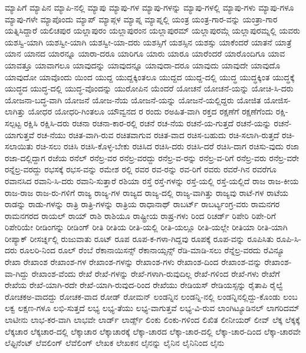 {ಮ್ಯಾಪಿಗೆ
ಮ್ಯಾಪಿನ
ಮ್ಯಾಪಿ-ನಲ್ಲಿ
ಮ್ಯಾಪು
ಮ್ಯಾಪು-ಗಳ
ಮ್ಯಾಪು-ಗಳನ್ನು
ಮ್ಯಾಪು-ಗಳಲ್ಲಿ
ಮ್ಯಾಪು-ಗಳು
ಮ್ಯಾಪು-ಗಳೂ
ಮ್ಯಾಪು-ಗಳೇ
ಮ್ಯಾಪೊಂದು
ಮ್ಯಾಪ್
ಮ್ಯಾಪ್ಗಳ
ಮ್ಯಾಪ್ನ
ಮ್ಯಾಪ್ನಲ್ಲಿ
ಯಂತ್ರ
ಯಂತ್ರ-ಗಾರ-ವನ್ನು
ಯಂತ್ರಾ-ಗಾರ
ಯತ್ನಿಸಿದ್ದಾರೆ
ಯಲಿಚಪುರ
ಯಲ್ಲಾಪುರಂ
ಯಲ್ಲಾಪುರಂನ
ಯಲ್ಲಾಪುರಮ್
ಯಲ್ಲಾಪುರಮ್ಗೆ
ಯಲ್ಲಾಪುರಮ್ನಲ್ಲಿ
ಯವರು
ಯಶಸ್ವಿ-ಯಾಗಿ
ಯಶಸ್ವೀ-ಯಾಗಿ
ಯಶಸ್ವೀ-ಯಾ-ದರು
ಯಶಸ್ಸಿಗೆ
ಯಶಸ್ಸಿನ
ಯಶಸ್ಸು
ಯಾಕೆಂದರೆ
ಯಾತನೆ
ಯಾತ್ರೆ
ಯಾನ
ಯಾನದ
ಯಾರನ್ನೂ
ಯಾರಾ-ದರೂ
ಯಾರಿಗೂ
ಯಾರು
ಯಾರೂ
ಯಾರೆಂದರೆ
ಯಾರೊಂದಿಗೂ
ಯಾವ
ಯಾವತ್ತೂ
ಯಾವಾಗಲೂ
ಯಾವುದನ್ನು
ಯಾವುದನ್ನೂ
ಯಾವುದಾ-ದರೂ
ಯಾವುದು
ಯಾವುದೇ
ಯಾವುದೊ
ಯಾವುದೋ
ಯಾವೊಂದು
ಯಿಂದ
ಯುದ್ದ
ಯುದ್ದಕ್ಕಿಂತಲೂ
ಯುದ್ದದ
ಯುದ್ದ-ದಲ್ಲಿ
ಯುದ್ಧ
ಯುದ್ಧಕ್ಕಿಂತ
ಯುದ್ಧಕ್ಕೆ
ಯುದ್ಧದ
ಯುದ್ಧ-ದಲ್ಲಿ
ಯುದ್ಧ-ವೊಂದನ್ನು
ಯುರೋಪಿನ
ಯೆಂದರೆ
ಯೋಚನೆ
ಯೋಚನೆ-ಯನ್ನು
ಯೋಚಿ-ಸಿ-ದರು
ಯೋಜನಾ-ಬದ್ಧ-ವಾಗಿ
ಯೋಜನೆ
ಯೋಜ-ನೆಯ
ಯೋಜನೆ-ಯನ್ನು
ಯೋಜನೆ-ಯಲ್ಲಿದ್ದರು
ಯೋಜಿತ
ಯೋಜಿಸ-ಲಾಗಿತ್ತು
ಯೋಧರ
ಯೋಧರಿ-ಗಿಂತಲೂ
ಯೌವ್ವನದ
ರ
ರಂದು
ರಅಹಿತ-ವಾಗಿ
ರಕ್ತದ
ರಕ್ಷಣೆಗೆ
ರಕ್ಷಣೆಗೆಂದು
ರಕ್ಷಿ-ಸಲ್ಪಟ್ಟ
ರಕ್ಷಿಸಿ
ರಕ್ಷಿಸಿ-ದರು
ರಚನಾ
ರಚನಾ-ಕಾರ-ರಲ್ಲಿ
ರಚನೆ
ರಚ-ನೆಯ
ರಚನೆ-ಯ-ಗುತ್ತದೆ
ರಚನೆ-ಯನ್ನು
ರಚನೆ-ಯಾಗುತ್ತವೆ
ರಚ-ನೆಯು
ರಚಿತ-ವಾಗಿ-ರುವ
ರಚಿತವಾಗುವ
ರಚಿತ-ವಾದ
ರಚಿಸ-ಬಹುದು
ರಚಿ-ಸಲಾಗಿ-ರುತ್ತದೆ
ರಚಿ-ಸಲಾಯಿತು
ರಚಿ-ಸಲು
ರಚಿಸಿ
ರಚಿಸಿ-ಕೊಳ್ಳ-ಬೇಕು
ರಚಿಸಿದ
ರಚಿಸಿ-ದರು
ರಚಿಸಿ-ದರೆ
ರಚಿಸಿ-ದಾಗ
ರಚಿಸು-ವುದು
ರಜಾ
ರಜಾ-ದಲ್ಲಿದ್ದಾಗ
ರಜೆಯ
ರನೆಲ್
ರನೆಲ್ರ-ವರ
ರನೆಲ್ರ-ವರದ್ದು
ರನೆಲ್ರ-ವ-ರನ್ನು
ರನೆಲ್ರ-ವ-ರಿಗೆ
ರನೆಲ್ರ-ವರು
ರನೆಲ್ರ-ವರೇ
ರನ್ನೆಲ್ರ-ವರದ್ದು
ರಭಸಕ್ಕೆ
ರಭಸ-ವನ್ನು
ರಮೇಶ
ರಲ್ಲಿ
ರವರ
ರವ-ರನ್ನು
ರವ-ರಿಗೆ
ರವರು
ರವರೆ-ಗಿನ
ರವರೆಗೂ
ರವಾನಸಿದ
ರವಾನಿ-ಸಿ-ದರು
ರವಾನಿ-ಸುತ್ತಾರೆ
ರಶಿಯಾ
ರಸ್ತೆ
ರಸ್ತೆ-ಗಳನ್ನು
ರಸ್ತೆ-ಯಲ್ಲಿ
ರಸ್ತೆ-ಯಲ್ಲಿದೆ
ರಾಜ
ರಾಜ-ಕೀಯ
ರಾಜ-ರಾಜ
ರಾಜ-ರು-ಗಳಿಗೆ
ರಾಜ್ಯ
ರಾಜ್ಯ-ಗಳ
ರಾಜ್ಯದ
ರಾಜ್ಯ-ದಲ್ಲಿ
ರಾಜ್ಯ-ವಾಗಿತ್ತು
ರಾಜ್ಯವು
ರಾಟೆ-ಗಳ
ರಾಟೆಯ
ರಾಡನ್ನು
ರಾಡು-ಗಳನ್ನು
ರಾತ್ರಿ
ರಾತ್ರಿ-ಗಳನ್ನು
ರಾತ್ರಿಯ
ರಾಧಾನಾಥ್
ರಾಬರ್ಟ್
ರಾಬರ್ಟ್ಯಂಗ್ರ-ವರು
ರಾಮನಗರ
ರಾಮನಗರದ
ರಾಯಲ್
ರಾಯ್
ರಾಶಿ
ರಾಶಿಯೂ
ರಾಷ್ಟ್ರೀಯ
ರಾಷ್ರ-ಗಳು
ರಿಂದ
ರಿಚರ್ಡ್
ರಿಪೇರಿ
ರಿಪೇ-ರಿಗೆ
ರಿಪೇರಿಯೇ
ರೀಡಿಂಗನ್ನು
ರೀಡಿಂಗ್
ರೀತಿ
ರೀತಿಯ
ರೀತಿ-ಯಲ್ಲಿ
ರೀತಿ-ಯಲ್ಲೂ
ರೀತಿ-ಯಲ್ಲೇ
ರೀತಿಯಾ
ರೀತಿ-ಯಾಗಿ
ರೀಪ್ಯಾಕ್
ರೀಸರ್ಚ್ನಲ್ಲಿ
ರುಜುವಾತು
ರೂಟ್
ರೂಪ
ರೂಪ-ಕ-ಗಳಾ-ಗಿದ್ದವು
ರೂಪಕ್ಕೆ
ರೂಪ-ವನ್ನು
ರೂಪಿಸಿತು
ರೂಪಿ-ಸಿ-ದರು
ರೂಲರಿ-ನಿಂದ
ರೂಲ್
ರೆಂಬೆ
ರೆಕಾನಾಯಿಸನ್ಸ್
ರೆಕಾನಾಯ್ಸನ್ಸ್
ರೆಡಿ-ಮಾಡಿ-ಸಲು
ರೆನ್ನೆಲ್ರ-ವರದು
ರೆವಿನ್ಯೂ
ರೇಖಾ
ರೇಖಾಂಶ
ರೇಖಾಂಶ-ಗಳ
ರೇಖಾಂಶ-ಗಳನ್ನು
ರೇಖಾಂಶ-ಗಳು
ರೇಖಾಂಶ-ದಿಂದ
ರೇಖಾಂಶ-ವನ್ನು
ರೇಖಾಂಶ-ವಾ-ಗಿದ್ದು
ರೇಖಾಂಶ-ವೆಂದು
ರೇಖೆ
ರೇಖೆ-ಗಳನ್ನು
ರೇಖೆ-ಗಳಾಗಿ-ರುವುದಿಲ್ಲ
ರೇಖೆ-ಗಳಿಂದ
ರೇಖೆ-ಗಳು
ರೇಖೆಗೆ
ರೇಖೆಯ
ರೇಖೆ-ಯಾಗಿ-ರದೇ
ರೇಖೆ-ಯಾಗಿ-ರುವುದ-ರಿಂದ
ರೇಖೆಯು
ರೇಡಿಯಸ್
ರೇಡಿಯಸ್ಸನ್ನು
ರೈತಾಪಿ
ರೈಲ್ವೆ
ರೋಚಕಅ-ವಾದದ್ದು
ರೋಚಕ-ವಾದ
ರೋಡ್
ರೋಮನ್
ಲಂಡನ್ನಿನ
ಲಂಡನ್ನಿ-ನಲ್ಲಿ
ಲಂಡನ್ನಿನಲ್ಲಿದ್ದು-ಕೊಂಡು
ಲಂಬ
ಲಕ್ವ
ಲಕ್ಷಣ-ಗಳೂ
ಲಭಿ-ಸುತ್ತದೆ
ಲಭ್ಯ
ಲಭ್ಯ-ತೆಯು
ಲಭ್ಯ-ವಾಗುತ್ತವೆ
ಲಭ್ಯ-ವಿ-ರುವ
ಲಾಂಗಿಟ್ಯೂಡಿನಲ್
ಲಾಗರಿದಮ್
ಲಾಟೀನು
ಲಾಭ-ಕರ-ವಾಗಿ
ಲಾಭವೇ
ಲಾರ್ಡ್
ಲಾರ್ಡ್ಸ್
ಲಿಂಕು
ಲಿಂಕು-ಗಳಿಂದ
ಲಿಖಿತ
ಲೀನೀಯರ್
ಲೀವ್
ಲೆಕ್ಕ
ಲೆಕ್ಕಕ್ಕೆ
ಲೆಕ್ಕಚಾರ
ಲೆಕ್ಕಚಾರ-ದಲ್ಲಿ
ಲೆಕ್ಕಾಚಾರ
ಲೆಕ್ಕಾಚಾರಕ್ಕೆ
ಲೆಕ್ಕಾ-ಚಾರದ
ಲೆಕ್ಕಾ-ಚಾರ-ದಲ್ಲಿ
ಲೆಕ್ಕಾ-ಚಾರ-ದಿಂದ
ಲೆಕ್ಕಾ-ಚಾರವೇ
ಲೆಫ್ಟಿನೆಂಟ್
ಲೆವಲಿಂಗ್
ಲೆವೆಲಿಂಗ್
ಲೇಖಕ
ಲೇಖಕನ
ಲೈನನ್ನು
ಲೈನಿನ
ಲೈನಿನಿಂದ
ಲೈನು
}
